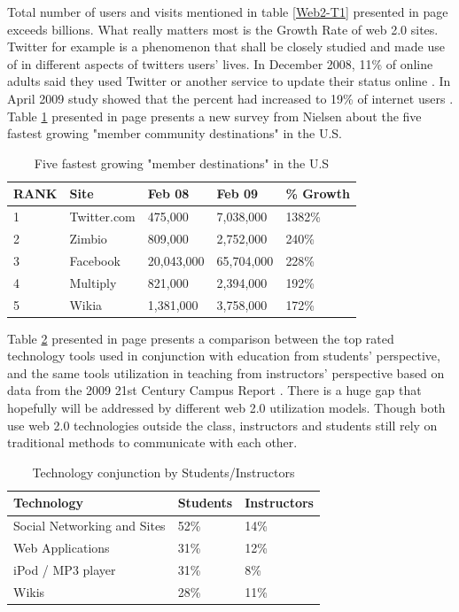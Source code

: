 \documentclass[12pt,a4paper,final,twoside,onecolumn,titlepage]{book}
\begin{document}
Total number of users and visits mentioned in table \ref{Web2-T1} presented in page \pageref{Web2-T1} exceeds billions. What really matters most is the Growth Rate of web 2.0 sites. Twitter for example is a phenomenon that shall be closely studied and made use of in different aspects of twitters users’ lives. In December 2008, 11\% of online adults said they used Twitter or another service to update their status online \cite{W04}. In April 2009 study showed that the percent had increased to 19\% of internet users \cite{W05}. Table \ref{Web2-T2} presented in page \pageref{Web2-T2} presents a new survey from Nielsen about the five fastest growing "member community destinations" in the U.S.

\begin{table}
\begin{center}
\caption{Five fastest growing "member destinations" in the U.S}
\begin{tabularx}{\textwidth}{|X|X|X|X|X|}
\hline RANK & Site & Feb 08 & Feb 09 & \% Growth \\
\hline 1 & Twitter.com & 475,000 & 7,038,000 & 1382\% \\
\hline 2 & Zimbio & 809,000 & 2,752,000 & 240\% \\
\hline 3 & Facebook & 20,043,000 & 65,704,000 & 228\% \\
\hline 4 & Multiply & 821,000 & 2,394,000 & 192\% \\
\hline 5 & Wikia & 1,381,000 & 3,758,000 & 172\% \\
\hline
\end{tabularx}
\end{center}
\label{Web2-T2}
\end{table}

Table \ref{Web2-T3} presented in page \pageref{Web2-T3} presents a comparison between the top rated technology tools used in conjunction with education from students’ perspective, and the same tools utilization in teaching from instructors’ perspective based on data from the 2009 21st Century Campus Report \cite{W06}. There is a huge gap that hopefully will be addressed by different web 2.0 utilization models. Though both use web 2.0 technologies outside the class, instructors and students still rely on traditional methods to communicate with each other.

\begin{table}
\begin{center}
\caption{Technology conjunction by Students/Instructors}
\begin{tabularx}{\textwidth}{|l|X|X|}
\hline Technology & Students & Instructors \\
\hline Social Networking and Sites	& 52\%	& 14\% \\
\hline Web Applications & 31\% & 12\% \\
\hline iPod / MP3 player	& 31\%	& 8\% \\
\hline Wikis	& 28\%	& 11\% \\
\hline
\end{tabularx}
\end{center}
\label{Web2-T3}
\end{table}
\end{document}
